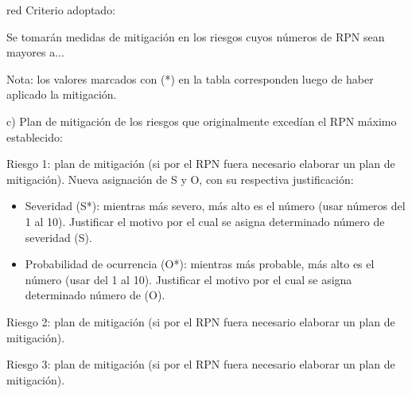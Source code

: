 \begin{consigna}{red}
	Criterio adoptado:

	Se tomarán medidas de mitigación en los riesgos cuyos números de RPN sean
	mayores a...

	Nota: los valores marcados con (*) en la tabla corresponden luego de haber
	aplicado la mitigación.

	c) Plan de mitigación de los riesgos que originalmente excedían el RPN máximo
	establecido:

	Riesgo 1: plan de mitigación (si por el RPN fuera necesario elaborar un plan de
	mitigación). Nueva asignación de S y O, con su respectiva justificación:
	\begin{itemize}
		\item Severidad (S*): mientras más severo, más alto es el número (usar números del 1
		      al 10). Justificar el motivo por el cual se asigna determinado número de
		      severidad (S).
		\item Probabilidad de ocurrencia (O*): mientras más probable, más alto es el número
		      (usar del 1 al 10). Justificar el motivo por el cual se asigna determinado
		      número de (O).
	\end{itemize}

	Riesgo 2: plan de mitigación (si por el RPN fuera necesario elaborar un plan de
	mitigación).

	Riesgo 3: plan de mitigación (si por el RPN fuera necesario elaborar un plan de
	mitigación).

\end{consigna}
